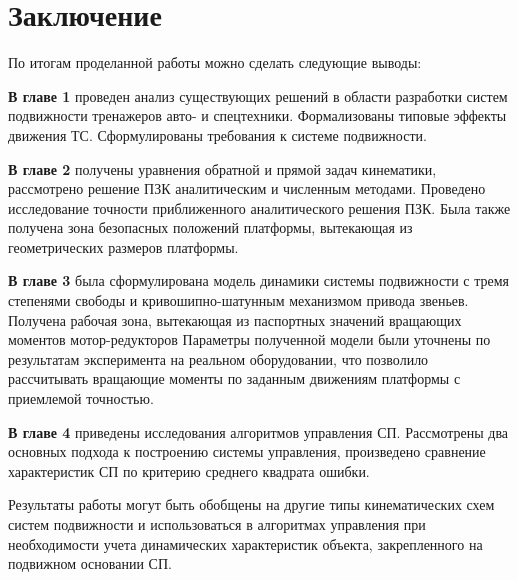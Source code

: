 \chapter*{Заключение}						%


По итогам проделанной работы можно сделать следующие выводы:

\textbf{В главе 1} проведен анализ существующих решений в области разработки систем подвижности тренажеров авто- и спецтехники. Формализованы типовые эффекты движения ТС. Сформулированы требования к системе подвижности.

\textbf{В главе 2} получены уравнения обратной и прямой задач кинематики, рассмотрено решение ПЗК аналитическим и численным методами. Проведено исследование точности приближенного аналитического решения ПЗК. Была также получена зона безопасных положений платформы, вытекающая из геометрических размеров платформы. 

\textbf{В главе 3} была сформулирована модель динамики системы подвижности с тремя степенями свободы и кривошипно-шатунным 
механизмом привода звеньев. Получена рабочая зона, вытекающая из паспортных значений вращающих моментов мотор-редукторов
Параметры полученной модели были уточнены по результатам эксперимента на реальном оборудовании, что позволило рассчитывать вращающие моменты по заданным движениям платформы с приемлемой точностью.  

\textbf{В главе 4} приведены исследования алгоритмов управления СП. Рассмотрены два основных подхода к построению системы управления, произведено сравнение характеристик СП по критерию среднего квадрата ошибки.

Результаты работы могут быть обобщены на другие типы кинематических схем систем подвижности и использоваться в алгоритмах управления при необходимости учета динамических характеристик объекта, закрепленного на подвижном основании СП.
